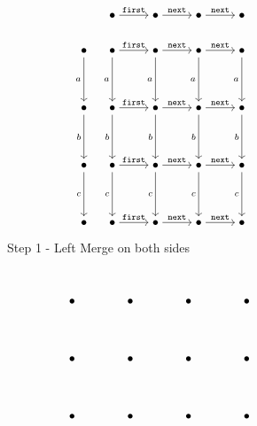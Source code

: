 \begin{figure}[!ht]
   \centering

   \begin{subfigure}[b]{0.45\textwidth}
\[\begin{tikzcd}[cramped,column sep=small]
	& \bullet && \bullet && \bullet && \bullet \\
	\bullet & \bullet && \bullet && \bullet && \bullet \\
	\\
	\bullet & \bullet && \bullet && \bullet && \bullet \\
	\\
	\bullet & \bullet && \bullet && \bullet && \bullet \\
	\\
	\bullet & \bullet && \bullet && \bullet && \bullet
	\arrow["{\mathtt{first}}", from=1-2, to=1-4]
	\arrow["{\mathtt{next}}", from=1-4, to=1-6]
	\arrow["{\mathtt{next}}", from=1-6, to=1-8]
	\arrow["a"', from=2-1, to=4-1]
	\arrow["{\mathtt{first}}", from=2-2, to=2-4]
	\arrow["a"', from=2-2, to=4-2]
	\arrow["{\mathtt{next}}", from=2-4, to=2-6]
	\arrow["a"', from=2-4, to=4-4]
	\arrow["{\mathtt{next}}", from=2-6, to=2-8]
	\arrow["a"', from=2-6, to=4-6]
	\arrow["a"', from=2-8, to=4-8]
	\arrow["b"', from=4-1, to=6-1]
	\arrow["{\mathtt{first}}", from=4-2, to=4-4]
	\arrow["b"', from=4-2, to=6-2]
	\arrow["{\mathtt{next}}", from=4-4, to=4-6]
	\arrow["b"', from=4-4, to=6-4]
	\arrow["{\mathtt{next}}", from=4-6, to=4-8]
	\arrow["b"', from=4-6, to=6-6]
	\arrow["b"', from=4-8, to=6-8]
	\arrow["c"', from=6-1, to=8-1]
	\arrow["{\mathtt{first}}", from=6-2, to=6-4]
	\arrow["c"', from=6-2, to=8-2]
	\arrow["{\mathtt{next}}", from=6-4, to=6-6]
	\arrow["c"', from=6-4, to=8-4]
	\arrow["{\mathtt{next}}", from=6-6, to=6-8]
	\arrow["c"', from=6-6, to=8-6]
	\arrow["c"', from=6-8, to=8-8]
	\arrow["{\mathtt{first}}", from=8-2, to=8-4]
	\arrow["{\mathtt{next}}", from=8-4, to=8-6]
	\arrow["{\mathtt{next}}", from=8-6, to=8-8]
\end{tikzcd}\]
      \caption{Step 1 - Left Merge on both sides}
   \end{subfigure}
   ~
   \begin{subfigure}[b]{0.45\textwidth}
\[\begin{tikzcd}[cramped,column sep=scriptsize]
	\bullet && \bullet && \bullet && \bullet \\
	\\
	\bullet && \bullet && \bullet && \bullet \\
	\\
	\bullet && \bullet && \bullet && \bullet \\

\end{tikzcd}\]
\end{subfigure}
\end{figure}
